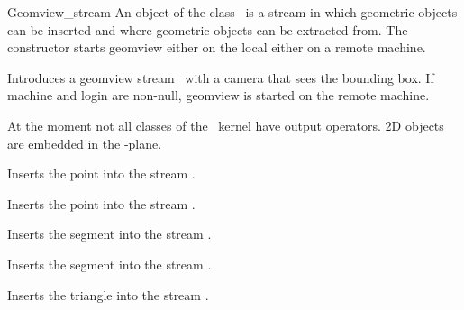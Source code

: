 \begin{ccClass}{Geomview_stream}
\ccDefinition
An object of the class \ccClassName\ is a stream in which geometric
objects can be inserted and where geometric objects can be extracted
from. The constructor starts geomview either on the local either on
a remote machine.


\ccThreeToTwo
\ccCreation
{}

{Introduces a geomview stream \ccVar\ with a camera that sees the
bounding box. If machine and login are non-null, geomview is started
on the remote machine.}



\ccOperations



\def\ccTagRmEigenClassName{\ccFalse}

At the moment not all classes of the \cgal\ kernel have output
operators. 2D objects are embedded in the -plane.

{Inserts the point  into the stream \ccVar.}


{Inserts the point  into the stream \ccVar.}


{Inserts the segment  into the stream \ccVar.}

{Inserts the segment  into the stream \ccVar.}


{Inserts the triangle  into the stream \ccVar.}



\end{ccClass}
